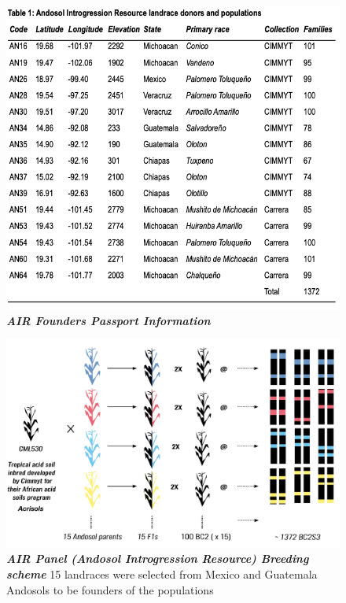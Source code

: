 \begin{figure}[!ht]
\includegraphics[width=\linewidth]{Chapter-4/figs/parentdata.png}
\caption[AIR Founders Passport Information]{ \textit{{\textbf{AIR Founders Passport Information}}}}
\label{fig::parentdata}
\end{figure}


\begin{figure}[!ht]
\includegraphics[width=\linewidth]{Chapter-4/figs/AIR_design.png}
\caption[ AIR Panel (Andosol Introgression Resource) Breeding scheme]
{\textit{{\textbf{AIR Panel (Andosol Introgression Resource) Breeding scheme}}}
15 landraces were selected from Mexico and Guatemala Andosols to be founders of the populations}
\label{fig::airdesign}
\end{figure}


